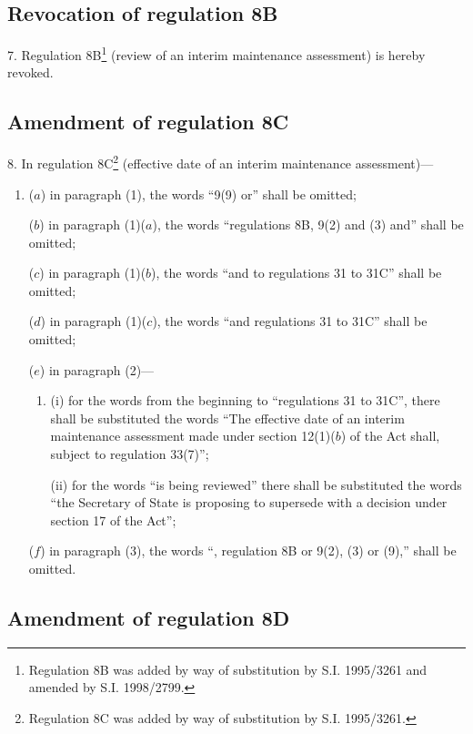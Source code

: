 \documentclass[12pt,a4paper]{article}
\begin{document}
\subsection[7. Revocation of regulation 8B]{Revocation of regulation 8B}

7.  Regulation 8B\footnote{\frenchspacing Regulation 8B was added by way of substitution by S.I. 1995/3261 and amended by S.I. 1998/2799.} (review of an interim maintenance assessment) is hereby revoked.

\subsection[8. Amendment of regulation 8C]{Amendment of regulation 8C}

8.  In regulation 8C\footnote{\frenchspacing Regulation 8C was added by way of substitution by S.I. 1995/3261.} (effective date of an interim maintenance assessment)—
\begin{enumerate}\item[]
($a$) in paragraph (1), the words “9(9) or” shall be omitted;

($b$) in paragraph (1)($a$), the words “regulations 8B, 9(2) and (3) and” shall be omitted;

($c$) in paragraph (1)($b$), the words “and to regulations 31 to 31C” shall be omitted;

($d$) in paragraph (1)($c$), the words “and regulations 31 to 31C” shall be omitted;

($e$) in paragraph (2)---
\begin{enumerate}\item[]
(i) for the words from the beginning to “regulations 31 to 31C”, there shall be substituted the words “The effective date of an interim maintenance assessment made under section 12(1)($b$) of the Act shall, subject to regulation 33(7)”;

(ii) for the words “is being reviewed” there shall be substituted the words “the Secretary of State is proposing to supersede with a decision under section 17 of the Act”;
\end{enumerate}

($f$) in paragraph (3), the words “, regulation 8B or 9(2), (3) or (9),” shall be omitted.
\end{enumerate}

\subsection[9. Amendment of regulation 8D]{Amendment of regulation 8D}
\end{document}
